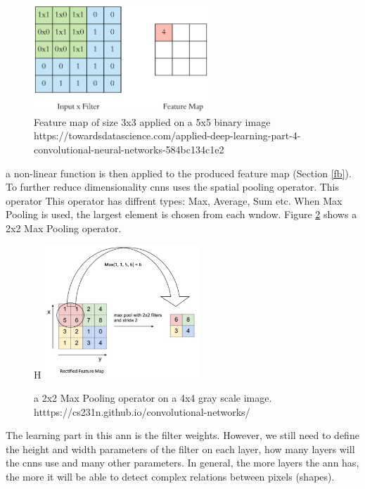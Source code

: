 \documentclass[runningheads]{llncs}
\begin{document}
\begin{figure}[H]
    \label{fm}
    \centering
    \includegraphics[height=4cm]{filter}
    \caption{Feature map of size 3x3 applied on a 5x5 binary image
    https://towardsdatascience.com/applied-deep-learning-part-4-convolutional-neural-networks-584bc134c1e2}
\end{figure}


a non-linear function is then applied to the produced feature map (Section \ref{fb}).
To further reduce dimensionality \gls{cnns} uses the spatial pooling operator. This operator
This operator has diffrent types: Max, Average, Sum etc. 
When Max Pooling is used, the largest element is chosen from each wndow.
Figure \ref{mp} shows a 2x2 Max Pooling operator.


\begin{figure}{H}
    \label{mp}
    \centering
    \includegraphics[height=5cm]{max_pool}
    \caption{a 2x2 Max Pooling operator on a 4x4 gray scale image.
    htttps://cs231n.github.io/convolutional-networks/}
\end{figure}

The learning part in this \gls{ann} is the filter weights. However, we 
still need to define the height and width parameters of the filter on each layer, how
many layers will the \gls{cnns} use and many other parameters. In general, 
the more layers the \gls{ann} has, the more it will be able to detect complex 
relations between pixels (shapes).
\end{document}

